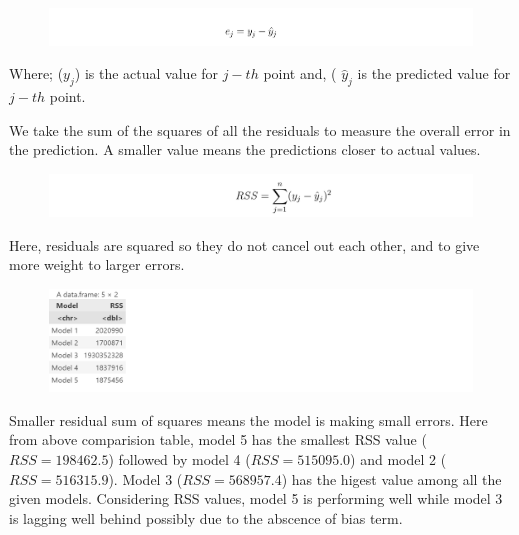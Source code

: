\documentclass[12pt,a4paper]{article}
\begin{document}
\begin{figure}[H]
  \centering
  \includegraphics[width=\textwidth]{p4.png}
\end{figure}

Where; ($y_j$) is the actual value for $j-th$ point and, ( $\hat{y}_j $\) 
is the predicted value for $j-th$ point. 

We take the sum of the squares of all the residuals to measure the overall error in the prediction.  
A smaller value means the predictions closer to actual values.


\begin{figure}[H]
  \centering
  \includegraphics[width=\textwidth]{p3.png}
\end{figure}

Here, residuals are squared so they do not cancel out each other, and to give more weight to 
larger errors.


\begin{figure}[H]
  \centering
  \includegraphics[width=\textwidth]{m1.png}
\end{figure}

Smaller residual sum of squares means the model is making small errors. Here from above comparision table, model 
5 has the smallest RSS value ($RSS= 198462.5$) followed by model 4 ($RSS= 515095.0$) and model 2
($RSS= 516315.9$). Model 3 ($RSS= 568957.4$) has the higest value among all the given models.
Considering RSS values, model 5 is performing well while model 3 is lagging well behind possibly due to 
the abscence of bias term. 
\end{document}
